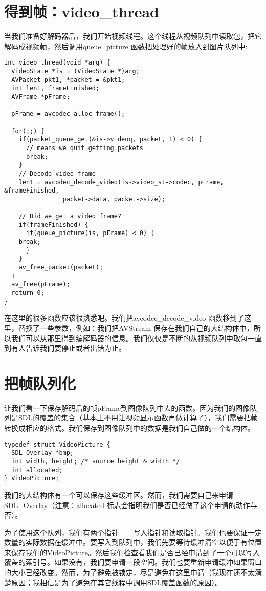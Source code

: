 \section{得到帧：video_thread}
当我们准备好解码器后，我们开始视频线程。这个线程从视频队列中读取包，把它解码成视频帧，然后调用queue_picture 函数把处理好的帧放入到图片队列中:
\begin{lstlisting}
int video_thread(void *arg) {
  VideoState *is = (VideoState *)arg;
  AVPacket pkt1, *packet = &pkt1;
  int len1, frameFinished;
  AVFrame *pFrame;

  pFrame = avcodec_alloc_frame();

  for(;;) {
    if(packet_queue_get(&is->videoq, packet, 1) < 0) {
      // means we quit getting packets
      break;
    }
    // Decode video frame
    len1 = avcodec_decode_video(is->video_st->codec, pFrame, &frameFinished,
                packet->data, packet->size);

    // Did we get a video frame?
    if(frameFinished) {
      if(queue_picture(is, pFrame) < 0) {
    break;
      }
    }
    av_free_packet(packet);
  }
  av_free(pFrame);
  return 0;
}
\end{lstlisting}

在这里的很多函数应该很熟悉吧。我们把avcodec_decode_video 函数移到了这里，替换了一些参数，例如：我们把AVStream 保存在我们自己的大结构体中，所以我们可以从那里得到编解码器的信息。我们仅仅是不断的从视频队列中取包一直到有人告诉我们要停止或者出错为止。

\section{把帧队列化}

让我们看一下保存解码后的帧pFrame到图像队列中去的函数。因为我们的图像队列是SDL的覆盖的集合（基本上不用让视频显示函数再做计算了），我们需要把帧转换成相应的格式。我们保存到图像队列中的数据是我们自己做的一个结构体。

\begin{lstlisting}
typedef struct VideoPicture {
  SDL_Overlay *bmp;
  int width, height; /* source height & width */
  int allocated;
} VideoPicture;
\end{lstlisting}

我们的大结构体有一个可以保存这些缓冲区。然而，我们需要自己来申请SDL_Overlay（注意：allocated 标志会指明我们是否已经做了这个申请的动作与否）。

为了使用这个队列，我们有两个指针－－写入指针和读取指针。我们也要保证一定数量的实际数据在缓冲中。要写入到队列中，我们先要等待缓冲清空以便于有位置 来保存我们的VideoPicture。然后我们检查看我们是否已经申请到了一个可以写入覆盖的索引号。如果没有，我们要申请一段空间。我们也要重新申请缓冲如果窗口的大小已经改变。然而，为了避免被锁定，尽是避免在这里申请（我现在还不太清楚原因；我相信是为了避免在其它线程中调用SDL覆盖函数的原因）。

